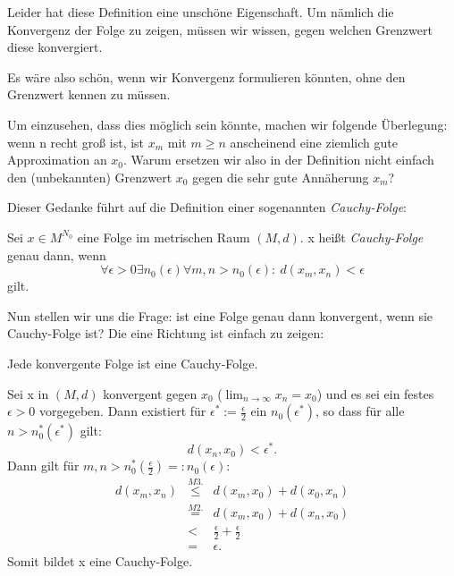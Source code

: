 \documentclass[10pt]{scrbook}
\begin{document}
Leider hat diese Definition eine unschöne Eigenschaft. Um nämlich die Konvergenz der Folge zu zeigen, müssen wir wissen, gegen welchen Grenzwert diese konvergiert. 

Es wäre also schön, wenn wir Konvergenz formulieren könnten, ohne den Grenzwert kennen zu müssen.

Um einzusehen, dass dies möglich sein könnte, machen wir folgende Überlegung: wenn n recht groß ist, ist $x_m$ mit $m\geq n$ anscheinend eine ziemlich gute Approximation an $x_0$. Warum ersetzen wir also in der Definition nicht einfach den (unbekannten) Grenzwert $x_0$ gegen die sehr gute Annäherung $x_m$?

Dieser Gedanke führt auf die Definition einer sogenannten \emph{Cauchy-Folge}:

\begin{Def}
Sei $x\in M^{N_0}$ eine Folge im metrischen Raum $(M, d)$. x heißt \emph{Cauchy-Folge} genau dann, wenn
\begin{displaymath}
\forall \epsilon > 0 \exists n_0(\epsilon) \forall m, n>n_0(\epsilon):\ d(x_m, x_n)<\epsilon
\end{displaymath}
gilt.
\end{Def}

Nun stellen wir uns die Frage: ist eine Folge genau dann konvergent, wenn sie Cauchy-Folge ist? Die eine Richtung ist einfach zu zeigen:

\begin{Le}
Jede konvergente Folge ist eine Cauchy-Folge.
\end{Le}
\begin{bew}
Sei x in $(M, d)$ konvergent gegen $x_0$ ($\lim_{n\rightarrow\infty} x_n = x_0$) und es sei ein festes $\epsilon>0$ vorgegeben. Dann existiert für $\epsilon^*:=\frac{\epsilon}{2}$ ein $n_0(\epsilon^*)$, so dass für alle $n>n_0^*(\epsilon^*)$ gilt: 
\begin{displaymath}
d(x_n, x_0)<\epsilon^*.
\end{displaymath}
Dann gilt für $m, n>n_0^*\left(\frac{\epsilon}{2}\right)=:n_0(\epsilon)$:
\begin{eqnarray*}
d(x_m, x_n) & \stackrel{M3.}{\leq} & d(x_m, x_0)+d(x_0, x_n) \\
& \stackrel{M2.}{=} & d(x_m, x_0)+d(x_n, x_0) \\
& < & \frac{\epsilon}{2} + \frac{\epsilon}{2} \\
& = & \epsilon.
\end{eqnarray*}
Somit bildet x eine Cauchy-Folge.
\end{bew}
\end{document}
